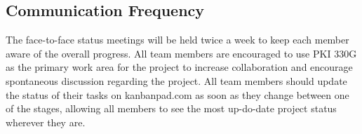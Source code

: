 \documentclass[11pt]{report}
\begin{document}
\subsection{Communication Frequency}
The face-to-face status meetings will be held twice a week to keep each member aware of the overall progress.
All team members are encouraged to use PKI 330G as the primary work area for the project to increase collaboration and encourage spontaneous discussion regarding the project.
All team members should update the status of their tasks on kanbanpad.com as soon as they change between one of the stages, allowing all members to see the most up-do-date project status wherever they are.
\end{document}
